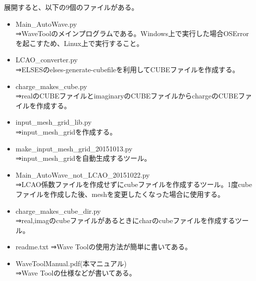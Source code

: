 \documentclass{jsarticle}
\begin{document}
展開すると、以下の9個のファイルがある。\\
\begin{itemize}
\item Main\_AutoWave.py\\
⇒WaveToolのメインプログラムである。Windows上で実行した場合OSErrorを起こすため、Linux上で実行すること。\\

\item LCAO\_converter.py\\
⇒ELSESのelses-generate-cubefileを利用してCUBEファイルを作成する。\\

\item charge\_makes\_cube.py\\
⇒realのCUBEファイルとimaginaryのCUBEファイルからchargeのCUBEファイルを作成する。\\

\item input\_mesh\_grid\_lib.py\\
⇒input\_mesh\_gridを作成する。\\

\item make\_input\_mesh\_grid\_20151013.py\\
⇒input\_mesh\_gridを自動生成するツール。\\

\item Main\_AutoWave\_not\_LCAO\_20151022.py\\
⇒LCAO係数ファイルを作成せずにcubeファイルを作成するツール。1度cubeファイルを作成した後、meshを変更したくなった場合に使用する。\\

\item charge\_makes\_cube\_dir.py\\
⇒real,imagのcubeファイルがあるときにcharのcubeファイルを作成するツール。\\

\item readme.txt
⇒Wave Toolの使用方法が簡単に書いてある。\\

\item WaveToolManual.pdf(本マニュアル)\\
⇒Wave Toolの仕様などが書いてある。\\

\end{itemize}


\end{document}
